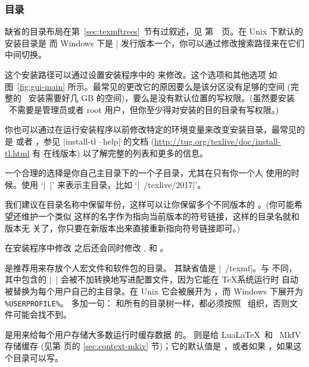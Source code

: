 \documentclass{article}
\begin{document}
\subsubsection{目录}
\label{sec:directories}

缺省的目录布局在第~\ref{sec:texmftrees}~节有过叙述，见
第~\pageref{sec:texmftrees}~页。在 Unix 下默认的安装目录是
 而 Windows 下是
|%
发行版本一个，你可以通过修改搜索路径来在它们中间切换。

这个安装路径可以通过设置安装程序中的  来修改。这个选项和其他选项
如图~\ref{fig:gui-main} 所示。最常见的更改它的原因要么是该分区没有足够的空间 (完
整的 \TL\ 安装需要好几 GB 的空间)，要么是没有默认位置的写权限。(虽然要安装
\TL\ 不需要是管理员或者 root 用户，但你至少得对安装的目的目录有写权限。)

你也可以通过在运行安装程序以前修改特定的环境变量来改变安装目录，最常见的是
 或者 ，参见
|install-tl --help| 的文档 (\url{http://tug.org/texlive/doc/install-tl.html} 有
在线版本) 以了解完整的列表和更多的信息。

一个合理的选择是你自己主目录下的一个子目录，尤其在只有你一个人
使用的时候。使用 `|~|' 来表示主目录，比如 `|~/texlive/2017|'。

我们建议在目录名称中保留年份，这样可以让你保留多个不同版本的
\TL{}。(你可能希望还维护一个类似 
这样的名字作为指向当前版本的符号链接，这样的目录名就和版本无
关了，你只要在新版本出来直接重新指向符号链接即可。)

在安装程序中修改  之后还会同时修改
,  和
。

 是推荐用来存放个人宏文件和软件包的目录。
其缺省值是 |~/texmf|。与  不同，其中包含的
|~| 会被不加转换地写进配置文件，因为它能在 \TeX 系统运行时
自动被替换为每个用户自己的主目录。在 Unix 它会被展开为
，而 Windows 下展开为 \verb|%USERPROFILE%|。
多加一句： 和所有的目录树一样，都必须按照
\TDS\ 组织，否则文件可能会找不到。

 是用来给每个用户存储大多数运行时缓存数据
的。 则是给 Lua\LaTeX\ 和 \ConTeXt\ MkIV 存储缓存
(见第 \pageref{sec:context-mkiv} 页的 \ref{sec:context-mkiv} 节)；它的默认值是
，或者如果 ，如果这个目录可以写。
\end{document}
